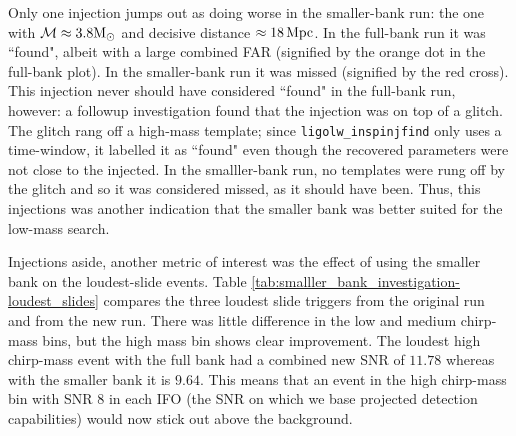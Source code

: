 Only one injection jumps out as doing worse in the smaller-bank run: the one with $\mathcal{M} \approx 3.8\mathrm{M_\odot}$ and decisive distance $\approx 18\,\mathrm{Mpc}$. In the full-bank run it was ``found", albeit with a large combined \ac{FAR} (signified by the orange dot in the full-bank plot). In the smaller-bank run it was missed (signified by the red cross). This injection never should have considered ``found" in the full-bank run, however: a followup investigation found that the injection was on top of a glitch. The glitch rang off a high-mass template; since \texttt{ligolw\_inspinjfind} only uses a time-window, it labelled it as ``found" even though the recovered parameters were not close to the injected. In the smalller-bank run, no templates were rung off by the glitch and so it was considered missed, as it should have been. Thus, this injections was another indication that the smaller bank was better suited for the low-mass search.

Injections aside, another metric of interest was the effect of using the smaller bank on the loudest-slide events. Table \ref{tab:smalller_bank_investigation-loudest_slides} compares the three loudest slide triggers from the original run and from the new run. There was little difference in the low and medium chirp-mass bins, but the high mass bin shows clear improvement. The loudest high chirp-mass event with the full bank had a combined new \ac{SNR} of $11.78$ whereas with the smaller bank it is $9.64$. This means that an event in the high chirp-mass bin with \ac{SNR} $8$ in each \ac{IFO} (the \ac{SNR} on which we base projected detection capabilities) would now stick out above the background.


